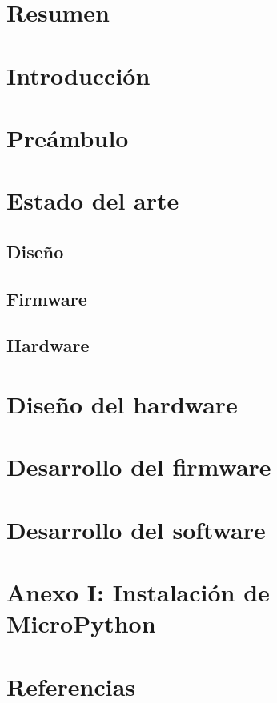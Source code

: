 


  


  \chapter*{Resumen}
    

  \tableofcontents \label{chapter:contents}

  \chapter{Introducción}
    
    
  \chapter{Preámbulo}
    

  \chapter{Estado del arte}
    \section{Diseño}
      

    \section{Firmware}
      

    \section{Hardware}
      

  \chapter{Diseño del hardware}
    

  \chapter{Desarrollo del firmware}
      

  \chapter{Desarrollo del software}
    

  \chapter{Anexo I: Instalación de MicroPython}
    

  \chapter{Referencias}
    \printbibliography[heading=none]

